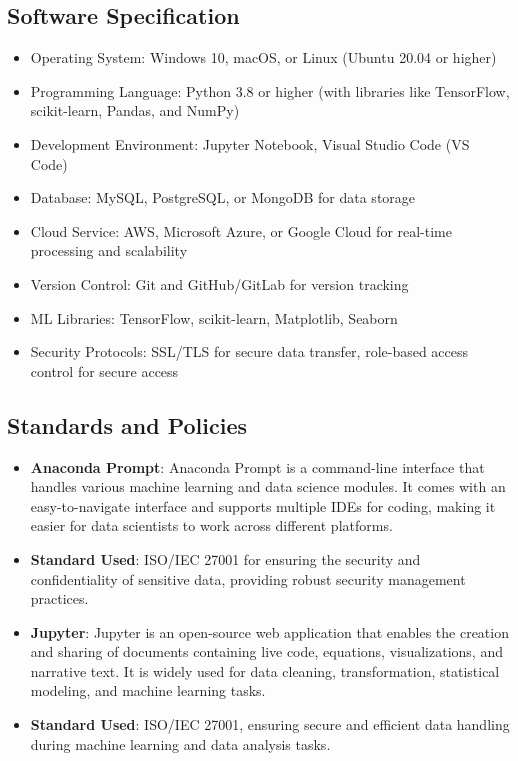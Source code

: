 \documentclass[10pt]{report}
\begin{document}
\begin{center}
\subsection{Software Specification}
\begin{itemize}
    \item Operating System: Windows 10, macOS, or Linux (Ubuntu 20.04 or higher)
    \item Programming Language: Python 3.8 or higher (with libraries like TensorFlow, scikit-learn, Pandas, and NumPy)
    \item Development Environment: Jupyter Notebook, Visual Studio Code (VS Code)
    \item Database: MySQL, PostgreSQL, or MongoDB for data storage
    \item Cloud Service: AWS, Microsoft Azure, or Google Cloud for real-time processing and scalability
    \item Version Control: Git and GitHub/GitLab for version tracking
    \item ML Libraries: TensorFlow, scikit-learn, Matplotlib, Seaborn
    \item Security Protocols: SSL/TLS for secure data transfer, role-based access control for secure access
\end{itemize}

\subsection{Standards and Policies}
\begin{itemize}
    \item \textbf{Anaconda Prompt}: Anaconda Prompt is a command-line interface that handles various machine learning and data science modules. It comes with an easy-to-navigate interface and supports multiple IDEs for coding, making it easier for data scientists to work across different platforms. 
    \item \textbf{Standard Used}: ISO/IEC 27001 for ensuring the security and confidentiality of sensitive data, providing robust security management practices.
    \item \textbf{Jupyter}: Jupyter is an open-source web application that enables the creation and sharing of documents containing live code, equations, visualizations, and narrative text. It is widely used for data cleaning, transformation, statistical modeling, and machine learning tasks. 
    \item \textbf{Standard Used}: ISO/IEC 27001, ensuring secure and efficient data handling during machine learning and data analysis tasks.
\end{itemize}


\end{center}
\end{document}
